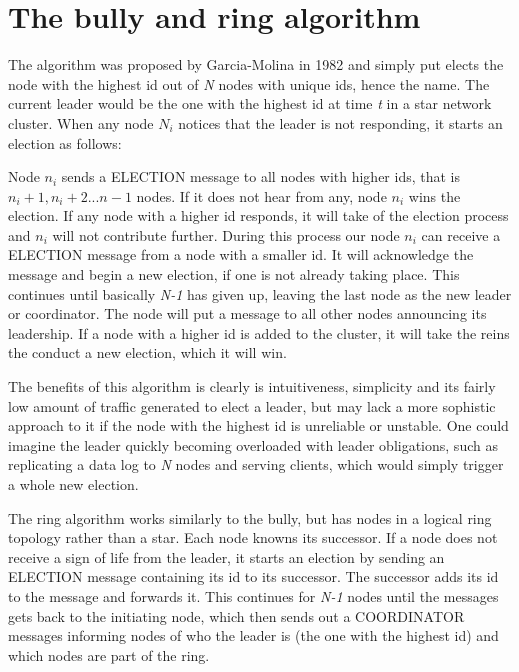 \section{The bully and ring algorithm}

The algorithm was proposed by Garcia-Molina in 1982 and simply put elects the node with the highest id out of \textit{N} nodes with unique ids, hence the name. The current leader would be the one with the highest id at time \textit{t} in a star network cluster. When any node $N_i$ notices that the leader is not responding, it starts an election as follows:

\noindent Node $n_i$ sends a ELECTION message to all nodes with higher ids, that is $n_i+1, n_i+2 ... n-1$ nodes. If it does not hear from any, node $n_i$ wins the election. If any node with a higher id responds, it will take of the election process and $n_i$ will not contribute further. During this process our node $n_i$ can receive a ELECTION message from a node with a smaller id. It will acknowledge the message and begin a new election, if one is not already taking place. This continues until basically \textit{N-1} has given up, leaving the last node as the new leader or coordinator. The node will put a message to all other nodes announcing its leadership. If a node with a higher id is added to the cluster, it will take the reins the conduct a new election, which it will win.

\noindent The benefits of this algorithm is clearly is intuitiveness, simplicity and its fairly low amount of traffic generated to elect a leader, but may lack a more sophistic approach to it if the node with the highest id is unreliable or unstable. One could imagine the leader quickly becoming overloaded with leader obligations, such as replicating a data log to \textit{N} nodes and serving clients, which would simply trigger a whole new election.

\noindent The ring algorithm works similarly to the bully, but has nodes in a logical ring topology rather than a star. Each node knowns its successor. If a node does not receive a sign of life from the leader, it starts an election by sending an ELECTION message containing its id to its successor. The successor adds its id to the message and forwards it. This continues for \textit{N-1} nodes until the messages gets back to the initiating node, which then sends out a COORDINATOR messages informing nodes of who the leader is (the one with the highest id) and which nodes are part of the ring.